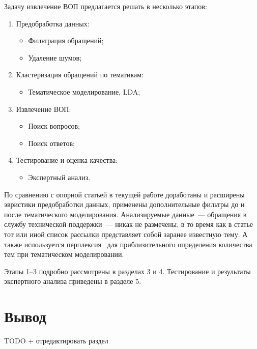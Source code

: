 Задачу извлечение ВОП предлагается решать в несколько этапов:

\begin{enumerate}
\item Предобработка данных:
\begin{itemize}
\item Фильтрация обращений;
\item Удаление шумов;
\end{itemize}
\item Кластеризация обращений по тематикам:
\begin{itemize}
\item Тематическое моделирование, LDA;
\end{itemize}
\item Извлечение ВОП:
\begin{itemize}
\item Поиск вопросов;
\item Поиск ответов;
\end{itemize}
\item Тестирование и оценка качества:
\begin{itemize}
\item Экспертный анализ.
\end{itemize}
\end{enumerate}

По сравнению с опорной статьей в текущей работе доработаны и расширены эвристики предобработки данных, применены дополнительные фильтры до и после тематического моделирования. Анализируемые данные~--– обращения в службу технической поддержки~--– никак не размечены, в то время как в статье~\cite{original} тот или иной список рассылки представляет собой заранее известную тему. А также используется перплексия~\cite{LDA} для приблизительного определения количества тем при тематическом моделировании.

Этапы 1--3 подробно рассмотрены в разделах 3 и 4. Тестирование и результаты экспертного анализа приведены в разделе 5.

\section{Вывод}
\label{sec:task_concl}

TODO + отредактировать раздел

\blindtext